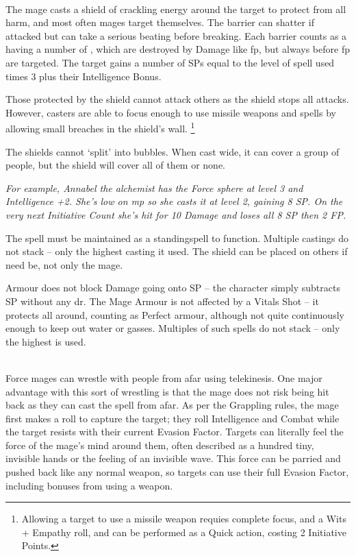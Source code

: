 \begin{multicols}{2}
\\
The mage casts a shield of crackling energy around the target to protect from all harm, and most often mages target themselves.
The barrier can shatter if attacked but can take a serious beating before breaking.
Each barrier counts as a having a number of , which are destroyed by Damage like \gls{fp}, but always before \gls{fp} are targeted.
The target gains a number of \glspl{SP} equal to the level of spell used times 3 plus their Intelligence Bonus.

Those protected by the shield cannot attack others as the shield stops all attacks.
However, casters are able to focus enough to use missile weapons and spells by allowing small breaches in the shield's wall.
\footnote{Allowing a target to use a missile weapon requies complete focus, and a Wits + Empathy roll, and can be performed as a Quick action, costing 2 Initiative Points.}

The shields cannot `split' into bubbles.
When cast wide, it can cover a group of people, but the shield will cover all of them or none.

\textit{For example, Annabel the alchemist has the Force sphere at level 3 and Intelligence +2.
She's low on \gls{mp} so she casts it at level 2, gaining 8 \gls{SP}.
On the very next Initiative Count she's hit for 10 Damage and loses all 8 \gls{SP} then 2 FP.}

The spell must be maintained as a \gls{standingspell} to function.
Multiple castings do not stack -- only the highest casting it used.
The shield can be placed on others if need be, not only the mage.

Armour does not block Damage going onto \gls{SP} -- the character simply subtracts \gls{SP} without any \gls{dr}. The Mage Armour is not affected by a Vitals Shot -- it protects all around, counting as Perfect armour, although not quite continuously enough to keep out water or gasses. Multiples of such spells do not stack -- only the highest is used.

\spelllevel

\\
Force mages can wrestle with people from afar using telekinesis. One major advantage with this sort of wrestling is that the mage does not risk being hit back as they can cast the spell from afar. As per the Grappling rules, the mage first makes a roll to capture the target; they roll Intelligence and Combat while the target resists with their current Evasion Factor. Targets can literally feel the force of the mage's mind around them, often described as a hundred tiny, invisible hands or the feeling of an invisible wave. This force can be parried and pushed back like any normal weapon, so targets can use their full Evasion Factor, including bonuses from using a weapon.


\end{multicols}
